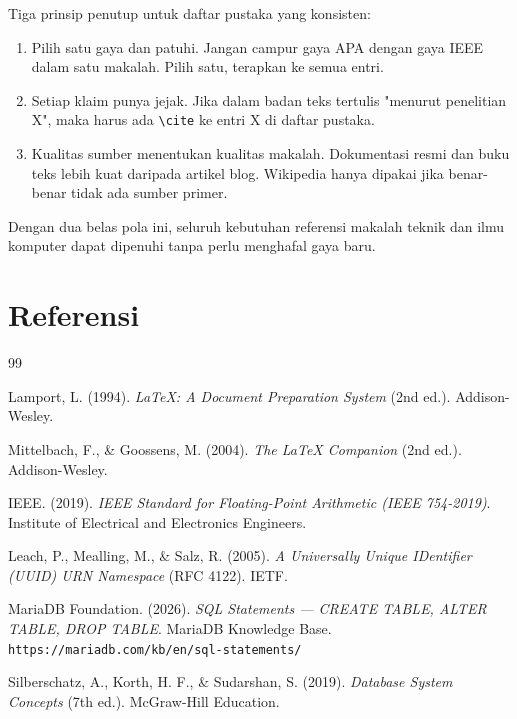 \documentclass[11pt,a4paper]{article}
\begin{document}
Tiga prinsip penutup untuk daftar pustaka yang konsisten:

\begin{enumerate}
	\item Pilih satu gaya dan patuhi. Jangan campur gaya APA dengan gaya IEEE dalam satu makalah. Pilih satu, terapkan ke semua entri.
	\item Setiap klaim punya jejak. Jika dalam badan teks tertulis "menurut penelitian X", maka harus ada \texttt{\textbackslash cite} ke entri X di daftar pustaka.
	\item Kualitas sumber menentukan kualitas makalah. Dokumentasi resmi dan buku teks lebih kuat daripada artikel blog. Wikipedia hanya dipakai jika benar-benar tidak ada sumber primer.
\end{enumerate}

Dengan dua belas pola ini, seluruh kebutuhan referensi makalah teknik dan ilmu komputer dapat dipenuhi tanpa perlu menghafal gaya baru.

\newpage
\section*{Referensi}

\begin{thebibliography}{99}

	Lamport, L. (1994).
	\textit{LaTeX: A Document Preparation System} (2nd ed.).
	Addison-Wesley.

	Mittelbach, F., \& Goossens, M. (2004).
	\textit{The LaTeX Companion} (2nd ed.).
	Addison-Wesley.

	IEEE. (2019).
	\textit{IEEE Standard for Floating-Point Arithmetic
		(IEEE 754-2019)}.
	Institute of Electrical and Electronics Engineers.

	Leach, P., Mealling, M., \& Salz, R. (2005).
	\textit{A Universally Unique IDentifier (UUID)
		URN Namespace} (RFC 4122). IETF.

	MariaDB Foundation. (2026).
	\textit{SQL Statements --- CREATE TABLE, ALTER TABLE,
		DROP TABLE}.
	MariaDB Knowledge Base.
	\texttt{https://mariadb.com/kb/en/sql-statements/}

	Silberschatz, A., Korth, H. F., \& Sudarshan, S. (2019).
	\textit{Database System Concepts} (7th ed.).
	McGraw-Hill Education.

\end{thebibliography}
\end{document}
